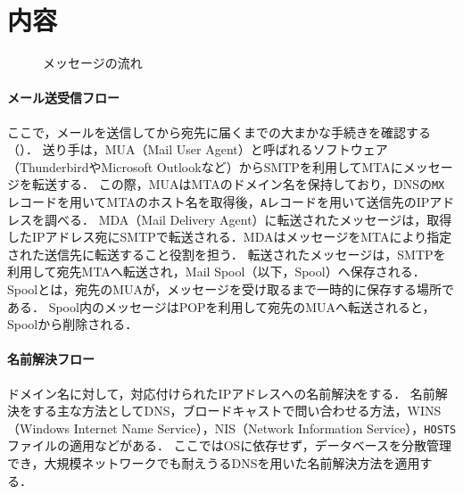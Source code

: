 \section{内容}
\begin{wrapfigure}{r}[0mm]{.48\textwidth}
    \vspace{-.5cm}
    
    \caption{メッセージの流れ\footnotemark[1]}
    \label{fig:メール送受信フロー}
    \vspace{-.5cm}
\end{wrapfigure}
\newcommand{\smtp}{SMTP}
\newcommand{\pop}{POP}
\newcommand{\imap}{IMAP}
\paragraph{メール送受信フロー}
ここで，メールを送信してから宛先に届くまでの大まかな手続きを確認する（）．
送り手は，MUA（Mail User Agent）と呼ばれるソフトウェア（ThunderbirdやMicrosoft Outlookなど）から\smtp を利用してMTAにメッセージを転送する．
この際，MUAはMTAのドメイン名を保持しており，DNSの\texttt{MX}レコードを用いてMTAのホスト名を取得後，\texttt{A}レコードを用いて送信先のIPアドレスを調べる．
MDA（Mail Delivery Agent）に転送されたメッセージは，取得したIPアドレス宛に\smtp で転送される．MDAはメッセージをMTAにより指定された送信先に転送すること役割を担う．
転送されたメッセージは，\smtp を利用して宛先MTAへ転送され，Mail Spool（以下，Spool）へ保存される．
Spoolとは，宛先のMUAが，メッセージを受け取るまで一時的に保存する場所である．
Spool内のメッセージは\pop を利用して宛先のMUAへ転送されると，Spoolから削除される．
\hfill\cite[p.9\ -\ p.11, p.13]{2004postfix詳解}
\paragraph{名前解決フロー}
ドメイン名に対して，対応付けられたIPアドレスへの名前解決をする．
名前解決をする主な方法としてDNS，ブロードキャストで問い合わせる方法\cite[p.135]{いちばんやさしいネットワークの本}，WINS（Windows Internet Name Service），NIS（Network Information Service），\texttt{HOSTS}ファイルの適用などがある．
ここではOSに依存せず，データベースを分散管理でき，大規模ネットワークでも耐えうるDNSを用いた名前解決方法を適用する．

